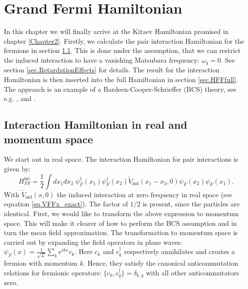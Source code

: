 
\chapter{Grand Fermi Hamiltonian} %

\label{Chapter4} %


In this chapter we will finally arrive at the Kitaev Hamiltonian promised in chapter \ref{Chapter2}. Firstly, we calculate the pair interaction Hamiltonian for the fermions in section \ref{sec.HFFint}. This is done under the assumption, that we can restrict the induced interaction to have a vanishing Matsubara frequency: $\omega_q = 0$. See section \ref{sec.RetardationEffects} for details. The result for the interaction Hamiltonian is then inserted into the full Hamiltonian in section \ref{sec.HFFfull}. The approach is an example of a Bardeen-Cooper-Schrieffer (BCS) theory, see e.g. \cite[chapter 3]{Tinkham}, \cite[pp. 153-163]{LandauStatPhys2} and \cite[pp. 359-369]{PlischkeStatPhys}. 

\section{Interaction Hamiltonian in real and momentum space} \label{sec.HFFint}
We start out in real space. The interaction Hamiltonian for pair interactions is given by:
\begin{equation}
H^\text{int}_{FF} = \frac{1}{2}\int dx_1dx_2\; \psi^\dagger_F(x_1)\psi^\dagger_F(x_2)\tilde{V}_{\text{ind}}(x_1-x_2,0) \psi_F(x_2) \psi_F(x_1).
\label{eq.HFFintdef}
\end{equation}
With $\tilde{V}_\text{ind}(x,0)$ the induced interaction at zero frequency in real space (see equation \eqref{eq.VFFx_exact}). The factor of $1/2$ is present, since the particles are identical. First, we would like to transform the above expression to momentum space. This will make it clearer of how to perform the BCS assumption and in turn the mean field approximation. The transformation to momentum space is carried out by expanding the field operators in plane waves: $\psi_F(x) = \frac{1}{\sqrt{\mathcal{L}}}\sum_k \text{e}^{ikx} c_k$. Here $c_k$ and $c^\dagger_k$ respectively annihilates and creates a fermion with momentum $k$. Hence, they satisfy the canonical anticommutation relations for fermionic operators: $\{c_k, c^\dagger_q\} = \delta_{k,q}$ with all other anticommutators zero.  

